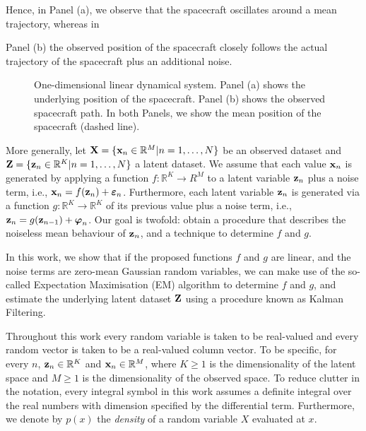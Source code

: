 \documentclass[12pt, oneside]{book}
\numberwithin{equation}{section}
\newcommand{\x}{{\bf x}}
\newcommand{\X}{{\bf X}}
\newcommand{\z}{{\bf z}}
\newcommand{\Z}{{\bf Z}}
\newcommand{\R}{\mathbb{R}}
\begin{document}
Hence, in Panel (a), we observe that the spacecraft oscillates around a mean trajectory, whereas in {Panel (b) the observed position of the spacecraft closely follows the actual trajectory of the spacecraft plus an additional noise.

\begin{figure}[h!]
	\hfill
	\hfill
	\hfill
	\caption{One-dimensional linear dynamical system. Panel (a) shows the underlying position of the spacecraft. Panel (b) shows the observed spacecraft path. In both Panels, we show the mean position of the spacecraft (dashed line).}
	\label{fig:1d-stock-system}
\end{figure}



More generally, let $\X = \{\x_n \in \mathbb{R}^M \vert n=1,\ldots, N\}$ be an observed dataset and $\Z =  \{\z_n \in \mathbb{R}^K \vert n=1,\ldots, N\}$ a latent dataset. We assume that each value $\x_n$ is generated by applying a function $f:\R^K\to R^M$ to a latent variable $\z_n$ plus a noise term, i.e., $\x_n = f(\z_n) + \boldsymbol\varepsilon_n$. Furthermore, each latent variable $\z_n$ is generated via a function $g:\R^K\to\R^K$ of its previous value plus a noise term, i.e., $\z_n = g(\z_{n-1}) + \boldsymbol{\varphi}_n$. Our goal is twofold: obtain a procedure that describes the noiseless mean behaviour of $\z_n$, and a technique to determine $f$ and $g$.

In this work, we show that if the proposed functions $f$ and $g$ are linear, and the noise terms are zero-mean Gaussian random variables, we can make use of the so-called Expectation Maximisation (EM) algorithm to determine $f$ and $g$, and estimate the underlying latent dataset $\Z$ using a procedure known as Kalman Filtering.

Throughout this work every random variable is taken to be real-valued and every random vector is taken to be a real-valued column vector. To be specific, for every $n$, $\z_n \in \R^K$ and $\x_n \in \R^M$, where $K \geq 1$ is the dimensionality of the latent space and $M \geq 1$ is the dimensionality of the observed space. To reduce clutter in the notation, every integral  symbol in this work assumes a definite integral over the real numbers with dimension specified by the differential term. Furthermore, we denote by $p(x)$ the \textit{density} of a random variable $X$ evaluated at $x$.

}
\end{document}
